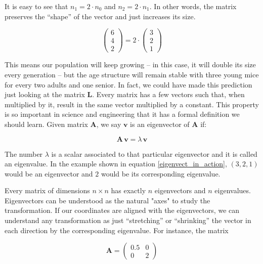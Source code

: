 \documentclass[12pt]{article}
\begin{document}
It is easy to see that $n_1 = 2 \cdot n_0$  and $n_2 = 2 \cdot n_1$. In other words, the matrix preserves the ``shape'' of the vector and just increases its size.

\begin{equation}
 \begin{pmatrix} 6\\ 4 \\ 2\end{pmatrix} =  2 \cdot\begin{pmatrix} 3\\ 2 \\ 1\end{pmatrix} 
 \label{eigenvect_in_action}
\end{equation}

This means our population will keep growing -- in this case, it will double its size every generation -- but the age structure will remain stable with three young mice for every two adults and one senior. In fact, we could have made this prediction just looking at the matrix $\mathbf{L}$. Every matrix has a few vectors such that, when multiplied by it, result in the same vector multiplied by a constant. This property is so important in science and engineering that it has a formal definition we should learn. Given matrix $\mathbf{A}$, we say $\mathbf{v}$ is an eigenvector of  $\mathbf{A}$ if:
 
\begin{equation}
	\label{eigendefinition}
	\mathbf{A} \, \mathbf{v}  = \lambda  \,	\mathbf{v}   
\end{equation}

The number $\lambda$ is a scalar associated to that particular eigenvector and it is called an eigenvalue. In the example shown in equation \ref{eigenvect_in_action}, $(3,2,1)$ would be an eigenvector and $2$ would be its corresponding eigenvalue.

Every matrix of dimensions $n \times n$ has exactly $n$ eigenvectors and $n$ eigenvalues. Eigenvectors can be understood as the natural "axes" to study the transformation. If our coordinates are aligned with the eigenvectors, we can understand any transformation as just ``stretching'' or ``shrinking'' the vector in each direction by the corresponding eigenvalue. For instance, the matrix

\begin{equation}
	\mathbf{A}=\begin{pmatrix} 0.5 & 0\\ 0 &  2 \end{pmatrix} 
\end{equation}
\end{document}
